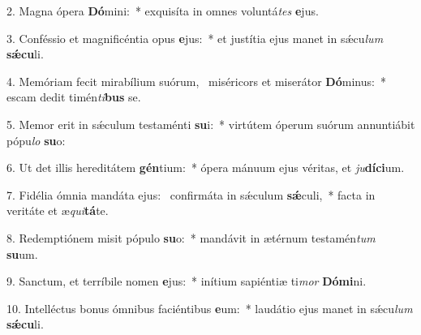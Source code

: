 2. Magna ópera \textbf{Dó}mini:~*  exquisíta in omnes voluntá\textit{tes} \textbf{e}jus.\

3. Conféssio et magnificéntia opus \textbf{e}jus:~*  et justítia ejus manet in sǽcu\textit{lum} \textbf{sǽ}\textbf{cu}li.\

4. Memóriam fecit mirabílium suórum, \dag\  miséricors et miserátor \textbf{Dó}minus:~*  escam dedit timén\textit{ti}\textbf{bus} se.\

5. Memor erit in sǽculum testaménti \textbf{su}i:~*  virtútem óperum suórum annuntiábit pópu\textit{lo} \textbf{su}o:\

6. Ut det illis hereditátem \textbf{gén}tium:~*  ópera mánuum ejus véritas, et \textit{ju}\textbf{dí}\textbf{ci}um.\

7. Fidélia ómnia mandáta ejus: \dag\  confirmáta in sǽculum \textbf{sǽ}culi,~*  facta in veritáte et æ\textit{qui}\textbf{tá}te.\

8. Redemptiónem misit pópulo \textbf{su}o:~*  mandávit in ætérnum testamén\textit{tum} \textbf{su}um.\

9. Sanctum, et terríbile nomen \textbf{e}jus:~*  inítium sapiéntiæ ti\textit{mor} \textbf{Dó}\textbf{mi}ni.\

10. Intelléctus bonus ómnibus faciéntibus \textbf{e}um:~*  laudátio ejus manet in sǽcu\textit{lum} \textbf{sǽ}\textbf{cu}li.\


